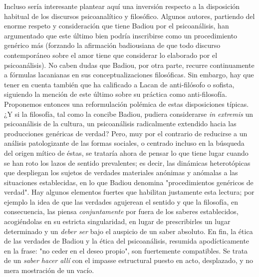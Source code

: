 \documentclass{book}
\begin{document}
Incluso sería interesante plantear aquí una inversión respecto a la
disposición habitual de los discursos psicoanalítico y filosófico.
Algunos autores, partiendo del enorme respeto y consideración que tiene
Badiou por el psicoanálisis, han argumentado que este último bien podría
inscribirse como un procedimiento genérico más (forzando la afirmación
badiousiana de que todo discurso contemporáneo sobre el amor tiene que
considerar lo elaborado por el psicoanálisis). No caben dudas que
Badiou, por otra parte, recurre continuamente a fórmulas lacanianas en
sus conceptualizaciones filosóficas. Sin embargo, hay que tener en
cuenta también que ha calificado a Lacan de anti-filósofo o sofista,
siguiendo la mención de este último sobre su práctica como
anti-filosofía. Proponemos entonces una reformulación polémica de estas
disposiciones típicas. ¿Y si la filosofía, tal como la concibe Badiou,
pudiera considerarse \emph{in extremis} un psicoanálisis de la cultura,
un psicoanálisis radicalmente extendido hacia las producciones genéricas
de verdad? Pero, muy por el contrario de reducirse a un análisis
patologizante de las formas sociales, o centrado incluso en la búsqueda
del origen mítico de éstas, se trataría ahora de pensar lo que tiene
lugar cuando se han roto los lazos de sentido prevalentes; es decir, las
dinámicas heterotópicas que despliegan los sujetos de verdades
materiales anónimas y anómalas a las situaciones establecidas, en lo que
Badiou denomina "procedimientos genéricos de verdad". Hay algunos
elementos fuertes que habilitan justamente esta lectura; por ejemplo la
idea de que las verdades agujerean el sentido y que la filosofía, en
consecuencia, las piensa \emph{conjuntamente} por fuera de los saberes
establecidos, acogiéndolas en su estricta singularidad, en lugar de
prescribirles un lugar determinado y un \emph{deber ser} bajo el
auspicio de un saber absoluto. En fin, la ética de las verdades de
Badiou y la ética del psicoanálisis, resumida apodícticamente en la
frase: "no ceder en el deseo propio", son fuertemente compatibles. Se
trata de un \emph{saber hacer allí} con el impasse estructural puesto en
acto, desplazado, y no mera mostración de un vacío.
\end{document}
